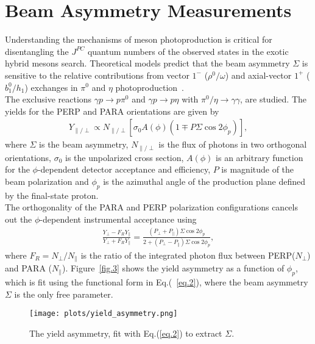\documentclass[a4paper]{jpconf}
\begin{document}
\section{Beam Asymmetry Measurements}
Understanding the mechanisms of meson photoproduction is critical for disentangling the $J^{PC}$ quantum numbers of the observed states in the exotic hybrid mesons search. Theoretical models predict that the beam asymmetry $\Sigma$ is sensitive to the relative contributions from vector $1^{-}$ ($\rho^{0}/\omega$) and axial-vector $1^{+}$ ($b_{1}^{0}/h_{1}$) exchanges in $\pi^{0}$ and $\eta$ photoproduction~\cite{ref.4}.\\
The exclusive reactions $\gamma p \rightarrow p \pi^{0}$ and $\gamma p \rightarrow p \eta$ with $\pi^{0}/\eta\rightarrow \gamma\gamma$, are studied. The yields for the PERP and PARA orientations are given by
\begin{align}
Y_{\parallel/\perp} \propto N_{\parallel/\perp}[\sigma_{0}A(\phi)(1 \mp P \Sigma \cos 2\phi_{p})],
\label{eq.1}
\end{align}
where $\Sigma$ is the beam asymmetry, $N_{\parallel/\perp}$ is the flux of photons in two orthogonal orientations, $\sigma_{0}$ is the unpolarized cross section, $A(\phi)$ is an arbitrary function for the $\phi$-dependent detector acceptance and efficiency, $P$ is magnitude of the beam polarization and $\phi_{p}$ is the azimuthal angle of the production plane defined by the final-state proton.\\
The orthogonality of the PARA and PERP polarization configurations cancels out the $\phi$-dependent instrumental acceptance using
\begin{align}
\frac{Y_{\perp}-F_{R}Y_{\parallel}}{Y_{\perp}+F_{R}Y_{\parallel}} = \frac{(P_{\perp}+P_{\parallel})\Sigma \cos 2\phi_{p}}{2+(P_{\perp}-P_{\parallel})\Sigma \cos 2\phi_{p}},
\label{eq.2}
\end{align}
where $F_{R} = N_{\perp}/N_{\parallel}$ is the ratio of the integrated photon flux between PERP($N_{\perp}$) and PARA ($N_{\parallel}$). Figure~\ref{fig.3} shows the yield asymmetry as a function of $\phi_{p}$, which is fit using the functional form in Eq.(~\ref{eq.2}), where the beam asymmetry $\Sigma$ is the only free parameter.

\begin{figure}[h]
    \centering
    \texttt{[image: plots/yield\_asymmetry.png]}
    \caption{\label{fig.2}The yield asymmetry, fit with Eq.(\ref{eq.2}) to extract $\Sigma$.}
\end{figure}
\end{document}
